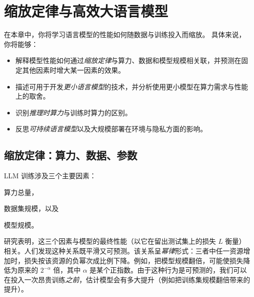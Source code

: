 \chapter[缩放定律与效率]{缩放定律与高效大语言模型}\label{chap:scaling}

\begin{learningbox}
在本章中，你将学习语言模型的性能如何随数据与训练投入而缩放。
具体来说，你将能够：
\begin{itemize}[leftmargin=*, nosep]
    \item 解释模型性能如何通过{\em 缩放定律}与算力、数据和模型规模相关联，并预测在固定其他因素时增大某一因素的效果。
    \item 描述可用于开发{\em 更小语言模型}的技术，并分析使用更小模型在算力需求与性能上的取舍。
    \item 识别{\em 推理时算力}与训练时算力的区别。
    \item 反思\emph{可持续语言模型}以及大规模部署在环境与隐私方面的影响。
\end{itemize}
\end{learningbox}

\section{缩放定律：算力、数据、参数}
\label{sec:scaling-laws}
LLM 训练涉及三个主要因素：\begin{enumerate*}[label=(\arabic*)]
    \item 算力总量，
    \item 数据集规模，以及
    \item 模型规模。
\end{enumerate*}
研究表明，这三个因素与模型的最终性能（以它在留出测试集上的损失 $L$ 衡量）相关。人们发现这种关系既平滑又可预测。该关系呈\emph{幂律}形式：三者中任一资源增加时，损失按该资源的负幂次成比例下降。例如，把模型规模翻倍，可能使损失降低为原来的 $2^{-\alpha}$ 倍，其中 $\alpha$ 是某个正指数。由于这种行为是可预测的，我们可以在投入一次昂贵训练{\em 之前}，估计模型会有多大提升（例如把训练集规模翻倍带来的提升）。

